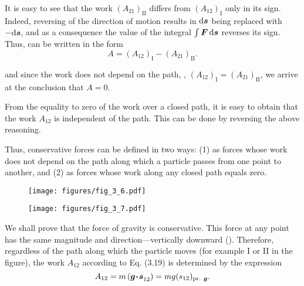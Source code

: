 \noindent
It is easy to see that the work $(A_{21})_{\text{II}}$ differs from $(A_{12})_{\text{I}}$ only in its sign. Indeed, reversing of the direction of motion results in $\mathrm{d}\boldsymbol{s}$ being replaced with $-\mathrm{d}\boldsymbol{s}$, and as a consequence the value of the integral $\int\boldsymbol{F}\,\mathrm{d}\boldsymbol{s}$ reverses its sign. Thus,  can be written in the form
\begin{equation*}
A = (A_{12})_{\text{I}} - (A_{21})_{\text{II}}.
\end{equation*}

\noindent
and since the work does not depend on the path, \ie, $(A_{12})_{\text{I}}=(A_{21})_{\text{II}}$, we arrive at the conclusion that $A=0$.

From the equality to zero of the work over a closed path, it is easy to obtain that the work $A_{12}$ is independent of the path. This can be done by reversing the above reasoning.

Thus, conservative forces can be defined in two ways: (1) as forces whose work does not depend on the path along which a particle passes from one point to another, and (2) as forces whose work along any closed path equals zero.

\begin{figure}[t]
	\begin{minipage}[t]{0.5\linewidth}
		\begin{center}
			\texttt{[image: figures/fig\_3\_6.pdf]}
			\caption[]{}
			\label{fig:3_6}
		\end{center}
	\end{minipage}
	\hspace{-0.05cm}
	\begin{minipage}[t]{0.5\linewidth}
		\begin{center}
			\texttt{[image: figures/fig\_3\_7.pdf]}
			\caption[]{}
			\label{fig:3_7}
		\end{center}
	\end{minipage}
	\vspace{-0.3cm}
\end{figure}

We shall prove that the force of gravity is conservative. This force at any point has the same magnitude and direction---vertically downward (). Therefore, regardless of the path along which the particle moves (for example I or II in the figure), the work $A_{12}$ according to Eq. (3.19) is determined by the expression
\begin{equation*}
A_{12} = m\,(\boldsymbol{g\!\cdot\!s}_{12}) = mg(s_{12})_{\text{pr. }\boldsymbol{g}}.
\end{equation*}

